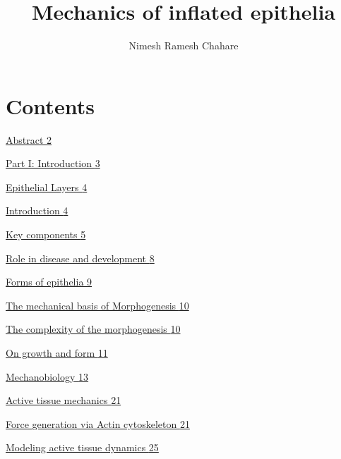 \documentclass[
]{article}
\title{Mechanics of inflated epithelia}
\author{Nimesh Ramesh Chahare}
\date{}
\begin{document}
\maketitle

\hypertarget{contents}{%
\section{Contents}\label{contents}}

\protect\hyperlink{abstract}{Abstract \protect\hyperlink{abstract}{2}}

\protect\hyperlink{part-i-introduction-1}{Part I: Introduction
\protect\hyperlink{part-i-introduction-1}{3}}

\protect\hyperlink{epithelial-layers-1}{Epithelial Layers
\protect\hyperlink{epithelial-layers-1}{4}}

\protect\hyperlink{introduction}{Introduction
\protect\hyperlink{introduction}{4}}

\protect\hyperlink{key-components}{Key components
\protect\hyperlink{key-components}{5}}

\protect\hyperlink{role-in-disease-and-development}{Role in disease and
development \protect\hyperlink{role-in-disease-and-development}{8}}

\protect\hyperlink{forms-of-epithelia}{Forms of epithelia
\protect\hyperlink{forms-of-epithelia}{9}}

\protect\hyperlink{the-mechanical-basis-of-morphogenesis-1}{The
mechanical basis of Morphogenesis
\protect\hyperlink{the-mechanical-basis-of-morphogenesis-1}{10}}

\protect\hyperlink{the-complexity-of-the-morphogenesis}{The complexity
of the morphogenesis
\protect\hyperlink{the-complexity-of-the-morphogenesis}{10}}

\protect\hyperlink{on-growth-and-form}{On growth and form
\protect\hyperlink{on-growth-and-form}{11}}

\protect\hyperlink{mechanobiology}{Mechanobiology
\protect\hyperlink{mechanobiology}{13}}

\protect\hyperlink{active-tissue-mechanics-1}{Active tissue mechanics
\protect\hyperlink{active-tissue-mechanics-1}{21}}

\protect\hyperlink{force-generation-via-actin-cytoskeleton}{Force
generation via Actin cytoskeleton
\protect\hyperlink{force-generation-via-actin-cytoskeleton}{21}}

\protect\hyperlink{modeling-active-tissue-dynamics}{Modeling active
tissue dynamics \protect\hyperlink{modeling-active-tissue-dynamics}{25}}
\end{document}
